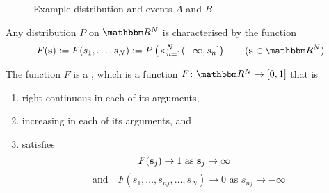 \begin{frame}

    \vspace{2em}
    \vspace{2em}
    \begin{figure}
    
       \begin{center}
        \caption{\label{f:gaussian_example} Example distribution and events $A$ and $B$}
       \end{center}
    \end{figure}  

\end{frame}



\begin{frame}

    \vspace{2em}
    Any distribution $P$ on $\RR^N$ is characterised by the function 
    \begin{equation*}
    \label{eq:ntf2}
    F(\bolds) :=
    F(s_1, \ldots, s_N) 
    := P \left( \times_{n=1}^N (-\infty, s_n] \right)
    \qquad (\bolds \in \RR^N)
    \end{equation*}
    
    The function $F$ is a ,
    which is a function $F \colon \RR^N \to [0, 1]$ that is
    \begin{enumerate}
            \label{enum:mcdf}
        \item right-continuous in each of its arguments,
        \item increasing in each of its arguments, and 
        \item satisfies
            \begin{equation*}
                F({\mathbf s}_j) \to 1 \text{ as }
                {\mathbf s}_j \to \infty 
                \quad 
            \end{equation*}
            \begin{equation*}
            \text{and} \quad
                F(s_1, \dots, s_{nj}, \dots, s_N) \to 0
                \text{ as }
                s_{nj} \to -\infty
            \end{equation*}
    \end{enumerate}
    
\end{frame}

